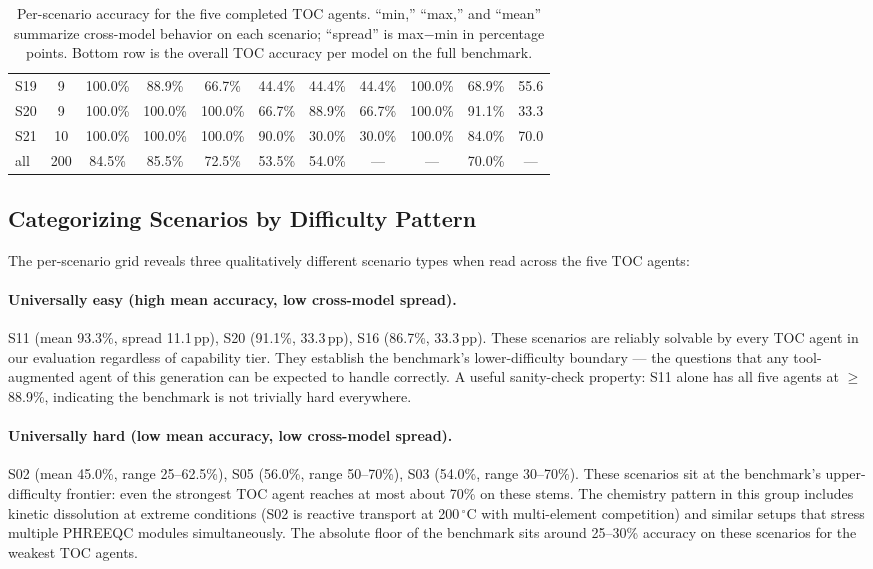 \documentclass{article}
\begin{document}
\begin{table}[h]
\begin{tabular}{lcccccccccc}
S19 & 9 & 100.0\% & 88.9\% & 66.7\% & 44.4\% & 44.4\% & 44.4\% & 100.0\% & 68.9\% & 55.6 \\
S20 & 9 & 100.0\% & 100.0\% & 100.0\% & 66.7\% & 88.9\% & 66.7\% & 100.0\% & 91.1\% & 33.3 \\
S21 & 10 & 100.0\% & 100.0\% & 100.0\% & 90.0\% & 30.0\% & 30.0\% & 100.0\% & 84.0\% & 70.0 \\
\midrule
all & 200 & 84.5\% & 85.5\% & 72.5\% & 53.5\% & 54.0\% & --- & --- & 70.0\% & --- \\
\bottomrule
\end{tabular}
\caption{Per-scenario accuracy for the five completed TOC agents. ``min,'' ``max,'' and ``mean'' summarize cross-model behavior on each scenario; ``spread'' is max$-$min in percentage points. Bottom row is the overall TOC accuracy per model on the full benchmark.}
\label{tab:appendix-scenario-grid}
\end{table}

\subsection{Categorizing Scenarios by Difficulty Pattern}

The per-scenario grid reveals three qualitatively different scenario types when read across the five TOC agents:

\paragraph{Universally easy (high mean accuracy, low cross-model spread).}
S11 (mean 93.3\%, spread 11.1\,pp), S20 (91.1\%, 33.3\,pp), S16 (86.7\%, 33.3\,pp). These scenarios are reliably solvable by every TOC agent in our evaluation regardless of capability tier. They establish the benchmark's lower-difficulty boundary --- the questions that any tool-augmented agent of this generation can be expected to handle correctly. A useful sanity-check property: S11 alone has all five agents at $\ge$88.9\%, indicating the benchmark is not trivially hard everywhere.

\paragraph{Universally hard (low mean accuracy, low cross-model spread).}
S02 (mean 45.0\%, range 25--62.5\%), S05 (56.0\%, range 50--70\%), S03 (54.0\%, range 30--70\%). These scenarios sit at the benchmark's upper-difficulty frontier: even the strongest TOC agent reaches at most about 70\% on these stems. The chemistry pattern in this group includes kinetic dissolution at extreme conditions (S02 is reactive transport at 200\,$^\circ$C with multi-element competition) and similar setups that stress multiple PHREEQC modules simultaneously. The absolute floor of the benchmark sits around 25--30\% accuracy on these scenarios for the weakest TOC agents.
\end{document}
